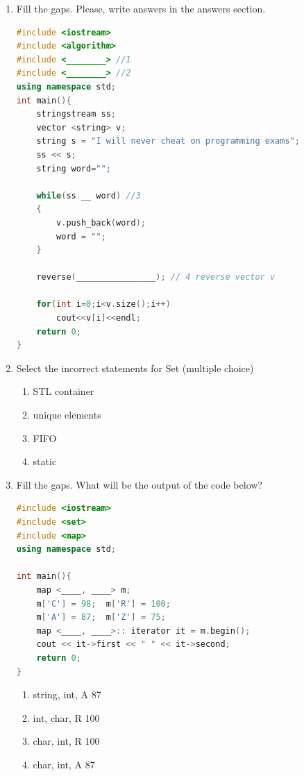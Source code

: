 \documentclass[10pt]{article}
\begin{document}
\begin{enumerate}
\item Fill the gaps. Please, write answers in the answers section.
\begin{lstlisting}[language=C++]
#include <iostream>
#include <algorithm>
#include <________> //1
#include <________> //2
using namespace std;
int main(){
    stringstream ss;
    vector <string> v;
    string s = "I will never cheat on programming exams";
    ss << s;
    string word="";
    
    while(ss __ word) //3
    {
        v.push_back(word);
        word = "";
    }
    
    reverse(________________); // 4 reverse vector v
    
    for(int i=0;i<v.size();i++)
        cout<<v[i]<<endl;
    return 0;
}
\end{lstlisting}





\item Select the incorrect statements for Set (multiple choice)
\begin{multicols}{4}
\begin{enumerate}
    \item STL container
    \item unique elements 
    \item FIFO 
    \item static 
\end{enumerate}
\end{multicols}






\item Fill the gaps. What will be the output of the code below?
\begin{lstlisting}[language=C++]
#include <iostream>
#include <set>
#include <map>
using namespace std;
 
int main(){
    map <____, ____> m;
    m['C'] = 98;  m['R'] = 100;
    m['A'] = 87;  m['Z'] = 75;
    map <____, ____>:: iterator it = m.begin();
    cout << it->first << " " << it->second;
    return 0;
}

\end{lstlisting}
\begin{multicols}{4}
\begin{enumerate}
    \item string, int, A  87
    \item int, char, R  100
    \item char, int, R 100
    \item char, int, A 87 
\end{enumerate}
\end{multicols}






\end{enumerate}
\end{document}
